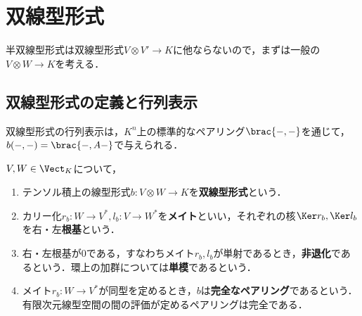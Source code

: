 \documentclass[uplatex, dvipdfmx]{jsreport}
\begin{document}
\section{双線型形式}

\begin{tcolorbox}[colframe=ForestGreen, colback=ForestGreen!10!white,breakable,colbacktitle=ForestGreen!40!white,coltitle=black,fonttitle=\bfseries\sffamily,
title=]
    半双線型形式は双線型形式$V\otimes V'\to K$に他ならないので，まずは一般の$V\otimes W\to K$を考える．
\end{tcolorbox}

\subsection{双線型形式の定義と行列表示}

\begin{tcolorbox}[colframe=ForestGreen, colback=ForestGreen!10!white,breakable,colbacktitle=ForestGreen!40!white,coltitle=black,fonttitle=\bfseries\sffamily,
title=]
    双線型形式の行列表示は，$K^n$上の標準的なペアリング$\brac{-,-}$を通じて，
    $b(-,-)=\brac{-,A-}$で与えられる．
\end{tcolorbox}

\begin{definition}
    $V,W\in\Vect_K$について，
    \begin{enumerate}
        \item テンソル積上の線型形式$b:V\otimes W\to K$を\textbf{双線型形式}という．
        \item カリー化$r_b:W\to V^*,l_b:V\to W^*$を\textbf{メイト}といい，それぞれの核$\Ker r_b,\Ker l_b$を右・左\textbf{根基}という．
        \item 右・左根基が$0$である，すなわちメイト$r_b,l_b$が単射であるとき，\textbf{非退化}であるという．環上の加群については\textbf{単模}であるという．
        \item メイト$r_b:W\to V^*$が同型を定めるとき，$b$は\textbf{完全なペアリング}であるという．有限次元線型空間の間の評価が定めるペアリングは完全である．
    \end{enumerate}
\end{definition}
\end{document}
